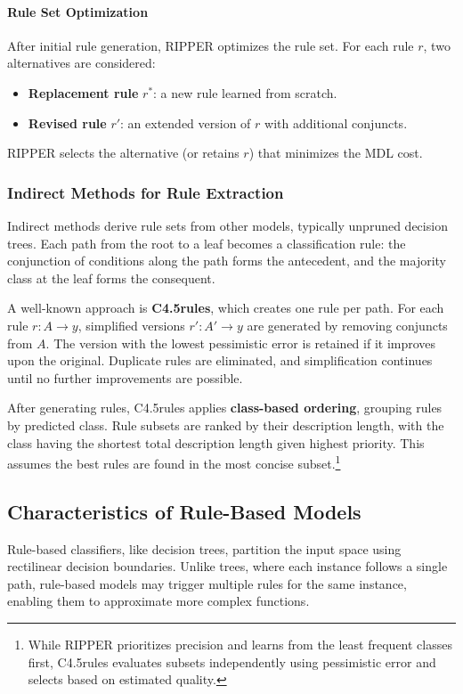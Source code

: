 \paragraph{Rule Set Optimization}
After initial rule generation, RIPPER optimizes the rule set. For each rule $r$, two alternatives are considered:
\begin{itemize}
    \item \textbf{Replacement rule} $r^*$: a new rule learned from scratch.
    \item \textbf{Revised rule} $r'$: an extended version of $r$ with additional conjuncts.
\end{itemize}
RIPPER selects the alternative (or retains $r$) that minimizes the MDL cost.
\subsubsection{Indirect Methods for Rule Extraction}

Indirect methods derive rule sets from other models, typically unpruned decision trees. Each path from the root to a leaf becomes a classification rule: the conjunction of conditions along the path forms the antecedent, and the majority class at the leaf forms the consequent.

A well-known approach is \textbf{C4.5rules}, which creates one rule per path. For each rule $r: A \rightarrow y$, simplified versions $r': A' \rightarrow y$ are generated by removing conjuncts from $A$. The version with the lowest pessimistic error is retained if it improves upon the original. Duplicate rules are eliminated, and simplification continues until no further improvements are possible.

After generating rules, C4.5rules applies \textbf{class-based ordering}, grouping rules by predicted class. Rule subsets are ranked by their description length, with the class having the shortest total description length given highest priority. This assumes the best rules are found in the most concise subset.\footnote{While RIPPER prioritizes precision and learns from the least frequent classes first, C4.5rules evaluates subsets independently using pessimistic error and selects based on estimated quality.}

\subsection{Characteristics of Rule-Based Models}

Rule-based classifiers, like decision trees, partition the input space using rectilinear decision boundaries. Unlike trees, where each instance follows a single path, rule-based models may trigger multiple rules for the same instance, enabling them to approximate more complex functions.

